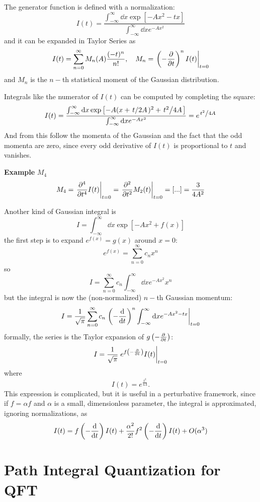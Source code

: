 
The generator function is defined with a normalization:
$$I(t) = \frac{\int_{-\infty}^{\infty} \dd x \exp\left[ -Ax^2-tx \right]}{
\int_{-\infty}^{\infty} \dd x e^{-Ax^2}}$$
and it can be expanded in Taylor Series as
$$I(t)= \sum_{n=0}^{\infty}M_n(A)\frac{(-t)^n}{n!},\quad
M_n=\eval{\left(-\pdv{}{t}\right)^n I(t)}_{t=0}$$
and $M_n$ is the $n-$th statistical moment of the Gaussian distribution.

Integrals like the numerator of $I(t)$ can be computed by completing the
square:
$$I(t) = \frac{\int_{-\infty}^{\infty} \dd x \exp\left[ -A(x+\flatfrac{t}{2A})^2
+\flatfrac{t^2}{4A}\right]}{\int_{-\infty}^{\infty} \dd x e^{-Ax^2}} = 
e^{\flatfrac{t^2}{4A}}
$$
And from this follow the momenta of the Gaussian and the fact that the odd momenta
are zero, since every odd derivative of $I(t)$ is proportional to $t$ and
vanishes.

\textbf{Example} $M_4$
\[
    M_4 = \eval{\pdv[4]{}{t}I(t)}_{t=0} = \eval{\pdv[2]{}{t}M_2(t)}_{t=0}=
    [...] = \frac{3}{4A^2}
\]

Another kind of Gaussian integral is
\[
I=\int_{-\infty}^{\infty} \dd x \exp\left[ -Ax^2 +f(x) \right]
\]
the first step is to expand $e^{f(x)}=g(x)$ around $x=0$:
\[
    e^{f(x)} = \sum_{n=0}^{\infty}c_nx^n
\]
so
\[
    I=\sum_{n=0}^{\infty}c_n\int_{-\infty}^{\infty} \dd x e^{-Ax^2}x^n
\]
but the integral is now the (non-normalized) $n-$th Gaussian momentum:
\[
    I=\frac{1}{\sqrt{\pi}}\sum_{n=0}^{\infty}c_n \eval{\left(-\dv[]{}{t}\right)^n
    \int_{-\infty}^{\infty} \dd x e^{-Ax^2-tx}}_{t=0}
\]
formally, the series is the Taylor expansion of $g\left(-\pdv[]{}{t}\right)$:
\[
    I = \frac{1}{\sqrt{\pi}}\eval{e^{f\left(-\pdv[]{}{t}\right)} I(t)}_{t=0}
\]
where
\[
    I(t) = e^{\frac{t^2}{4A}}.
\]
This expression is complicated, but it is useful in a perturbative framework,
since if $f=\alpha f$ and $\alpha$ is a small, dimensionless parameter, the
integral is approximated, ignoring normalizations, as
\[
I(t)=f\left(-\dv[]{}{t}\right)I(t) + \frac{\alpha^2}{2!} f^2\left(-\dv{}{t}
\right)I(t)+O(\alpha^3)
\]

\chapter{Path Integral Quantization for QFT}
